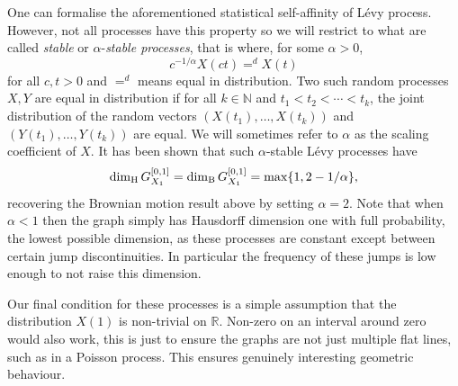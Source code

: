 One can formalise the aforementioned statistical self-affinity of L\'evy process. However, not all processes have this property so we will restrict to what are called \textit{stable} or $\alpha$-\textit{stable processes}, that is where, for some $\alpha > 0$,
\[
c^{-1/\alpha}X(ct) =^d X(t)
\]
for all $c,t > 0$ and $=^d$ means equal in distribution. Two such random processes $X,Y$ are equal in distribution if for all $k\in \mathbb{N}$ and $t_1< t_2 < \cdots < t_k$, the joint distribution of the random vectors $(X(t_1), \ldots, X(t_k))$ and $(Y(t_1),\ldots, Y(t_k))$ are equal. We will sometimes refer to $\alpha$ as the scaling coefficient of $X$. It has been shown that such $\alpha$-stable L\'evy processes have
\[
\dim_\text{H} G_{X_1}^{[0,1]} = \dim_{\textup{B}}  G_{X_1}^{[0,1]} = \max\{1, 2 - 1/\alpha\},
\]
recovering the Brownian motion result above by setting $\alpha = 2$. Note that when $\alpha < 1$ then the graph simply has Hausdorff dimension one with full probability, the lowest possible dimension, as these processes are constant except between certain jump discontinuities. In particular the frequency of these jumps is low enough to not raise this dimension.

Our final condition for these processes is a simple assumption that the distribution $X(1)$ is non-trivial on $\mathbb{R}$. Non-zero on an interval around zero would also work, this is just to ensure the graphs are not just multiple flat lines, such as in a Poisson process. This ensures genuinely interesting geometric behaviour.

